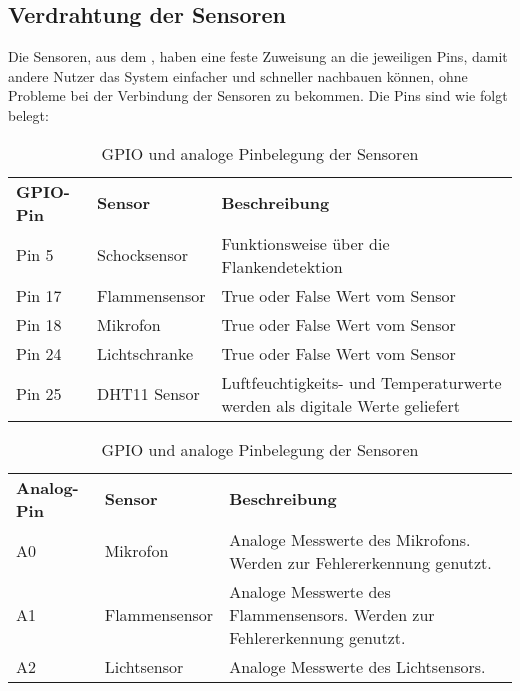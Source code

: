 \subsection{Verdrahtung der Sensoren}\label{Verdrahtung_der_Sensoren}
Die Sensoren, aus dem , haben eine feste Zuweisung an die jeweiligen Pins, damit andere Nutzer das System einfacher und schneller nachbauen können, ohne Probleme bei der Verbindung der Sensoren zu bekommen. Die Pins sind wie folgt belegt:
\begin{table}[htp]
	\caption{GPIO und analoge Pinbelegung der Sensoren}
	\label{tab:Pinbelegung}
	\begin{tabular}{p{} p{} p{}}
		\textbf{GPIO-Pin}	& \textbf{Sensor} & \textbf{Beschreibung} \\
		Pin 5 		& Schocksensor 	& Funktionsweise über die Flankendetektion\\	
		Pin 17		& Flammensensor	& True oder False Wert vom Sensor\\
		Pin 18		& Mikrofon		& True oder False Wert vom Sensor\\
		Pin 24		& Lichtschranke	& True oder False Wert vom Sensor\\
		Pin 25		& DHT11 Sensor	& Luftfeuchtigkeits- und Temperaturwerte werden als digitale Werte geliefert
	\end{tabular}
	\bigskip
	\begin{tabular}{p{} p{} p{}}
		\textbf{Analog-Pin}	& \textbf{Sensor} & \textbf{Beschreibung} \\
		A0	& Mikrofon 		& Analoge Messwerte des Mikrofons. Werden zur Fehlererkennung genutzt. \\
		A1	& Flammensensor	& Analoge Messwerte des Flammensensors. Werden zur Fehlererkennung genutzt.\\
		A2	& Lichtsensor	& Analoge Messwerte des Lichtsensors.
	\end{tabular}
\end{table}
\\
